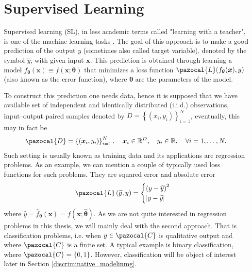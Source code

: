 \section{Supervised Learning}
Supervised learning (SL), in less academic terms called "learning with a teacher", is one of the machine learning tasks  \cite{supervised}.  The goal of this approach is to make a good prediction of the output $y$ (sometimes also called target variable), denoted by the symbol $\hat{y}$, with given input $\boldsymbol{x}$. This prediction is obtained through learning a model $f_{\boldsymbol{\theta}}\left(\boldsymbol{x}\right)\equiv f\left(\boldsymbol{x}; \boldsymbol{\theta}\right)$ that minimizes a loss function  $\pazocal{L}(f_{\boldsymbol{\theta}}(\boldsymbol{x}), y)$ (also known as the error function), where $\boldsymbol{\theta}$ are the parameters of the model. 

To construct this prediction one needs data, hence it is supposed that we have available set of independent and identically distributed (i.i.d.) observations, input--output paired samples denoted by $D = \left\lbrace \left(x_i , y_i \right)\right\rbrace_{i=1}^N$, eventually, this may in fact be 
\begin{equation}
\pazocal{D} = \left\lbrace\left( \boldsymbol{x}_i , y_i \right)\right\rbrace_{i=1}^N,\quad \boldsymbol{x}_i \in \R^D,\quad y_i \in \R,\quad\forall i = 1,\dots,N.
\end{equation}
Such setting is usually known as training data and its applications are regression problems. As an example, we can mention a couple of typically used loss functions for such problems. They are squared error and absolute error
\begin{equation}
\pazocal{L}\left(\widehat{y}, y \right) =
 \begin{cases}
	 \left(y - \widehat{y}\right)^2 \\
	 \abs{y - \widehat{y}} \\
\end{cases}   
\end{equation}
where $\widehat{y} = \widehat{f}_{\boldsymbol{\theta}}\left(\boldsymbol{x}\right) = f(\boldsymbol{x}; \widehat{\boldsymbol{\theta}})$. As we are not quite interested in regression problems in this thesis, we will mainly deal with the second approach. That is classification problems, i.e. when $y \in \pazocal{C}$ is qualitative output and where $\pazocal{C}$ is a finite set.  A typical example is binary classification, where $\pazocal{C} = \left\lbrace0,1 \right\rbrace$. However, classification will be object of interest later in Section \ref{discriminative_modelinmg}.

